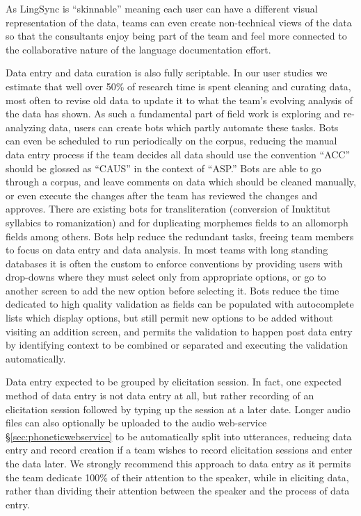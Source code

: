 \documentclass[letterpaper, 12pt, dvips]{mitwpl}
\begin{document}
As LingSync is ``skinnable'' meaning each user can have a different visual representation of the data, teams can even create non-technical views of the data so that the consultants enjoy being part of the team and feel more connected to the collaborative nature of the language documentation effort.

Data entry and data curation is also fully scriptable. In our user studies we estimate that well over 50\% of research time is spent cleaning and curating data, most often to revise old data to update it to what the team's evolving analysis of the data has shown. As such a fundamental part of field work is exploring and re-analyzing data, users can create bots which partly automate these tasks. Bots can even be scheduled to run periodically on the corpus, reducing the manual data entry process if the team decides all data should use the convention ``ACC'' should be glossed as ``CAUS'' in the context of ``ASP.'' Bots are able to go through a corpus, and leave comments on data which should be cleaned manually, or even execute the changes after the team has reviewed the changes and approves. There are existing bots for transliteration (conversion of Inuktitut syllabics to romanization) and for duplicating morphemes fields to an allomorph fields among others. Bots help reduce the redundant tasks, freeing team members to focus on data entry and data analysis. In most teams with long standing databases it is often the custom to enforce conventions by providing users with drop-downs where they must select only from appropriate options, or go to another screen to add the new option before selecting it. Bots reduce the time dedicated to high quality validation as fields can be populated with autocomplete lists which display options, but still permit new options to be added without visiting an addition screen, and permits the validation to happen post data entry by identifying context to be combined or separated and executing the validation automatically.

Data entry expected to be grouped by elicitation session. In fact, one expected method of data entry is not data entry at all, but rather recording of an elicitation session followed by typing up the session at a later date. Longer audio files can also optionally be uploaded to the audio web-service \S \ref{sec:phoneticwebservice} to be automatically split into utterances,  reducing data entry and record creation if a team wishes to record elicitation sessions and enter the data later. We strongly recommend this approach to data entry as it permits the team dedicate 100\% of their attention to the speaker, while in eliciting data, rather than dividing their attention between the speaker and the process of data entry.
\end{document}
